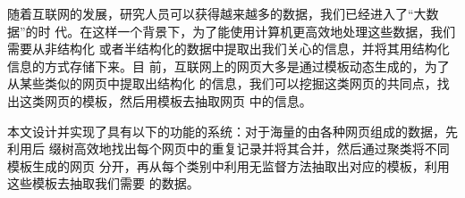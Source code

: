 
\makeatletter
\ifthu@bachelor\relax\else
  \ifthu@doctor
  \else
    \ifthu@master
    \fi
  \fi
\fi
\makeatother





\begin{cabstract}
  随着互联网的发展，研究人员可以获得越来越多的数据，我们已经进入了“大数据”的时
  代。在这样一个背景下，为了能使用计算机更高效地处理这些数据，我们需要从非结构化
  或者半结构化的数据中提取出我们关心的信息，并将其用结构化信息的方式存储下来。目
  前，互联网上的网页大多是通过模板动态生成的，为了从某些类似的网页中提取出结构化
  的信息，我们可以挖掘这类网页的共同点，找出这类网页的模板，然后用模板去抽取网页
  中的信息。

  本文设计并实现了具有以下的功能的系统：对于海量的由各种网页组成的数据，先利用后
  缀树高效地找出每个网页中的重复记录并将其合并，然后通过聚类将不同模板生成的网页
  分开，再从每个类别中利用无监督方法抽取出对应的模板，利用这些模板去抽取我们需要
  的数据。
\end{cabstract}

